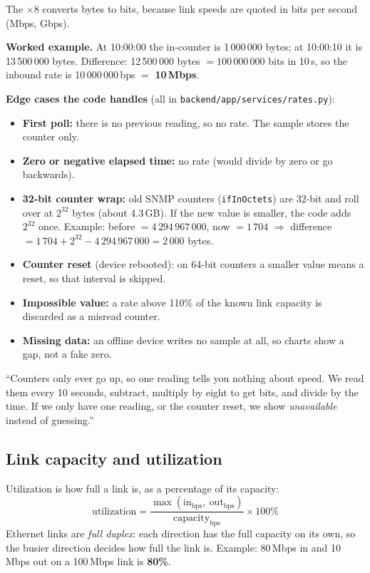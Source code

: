 \documentclass[11pt,a4paper]{article}
\newcommand{\code}[1]{\texttt{#1}}
\newcommand{\file}[1]{\texttt{\color{ink}#1}}
\begin{document}
The $\times 8$ converts bytes to bits, because link speeds are quoted in bits per second (Mbps, Gbps).

\textbf{Worked example.} At 10:00:00 the in-counter is 1\,000\,000 bytes; at 10:00:10 it is 13\,500\,000 bytes.
Difference: 12\,500\,000 bytes $= 100\,000\,000$ bits in 10\,s, so the inbound rate is 10\,000\,000\,bps $=$ \textbf{10\,Mbps}.

\textbf{Edge cases the code handles} (all in \file{backend/app/services/rates.py}):
\begin{itemize}
  \item \textbf{First poll:} there is no previous reading, so no rate. The sample stores the counter only.
  \item \textbf{Zero or negative elapsed time:} no rate (would divide by zero or go backwards).
  \item \textbf{32-bit counter wrap:} old SNMP counters (\code{ifInOctets}) are 32-bit and roll over at $2^{32}$ bytes
        (about 4.3\,GB). If the new value is smaller, the code adds $2^{32}$ once.
        Example: before $= 4\,294\,967\,000$, now $= 1\,704$ $\Rightarrow$ difference $= 1\,704 + 2^{32} - 4\,294\,967\,000 = 2\,000$ bytes.
  \item \textbf{Counter reset} (device rebooted): on 64-bit counters a smaller value means a reset, so that interval is skipped.
  \item \textbf{Impossible value:} a rate above 110\% of the known link capacity is discarded as a misread counter.
  \item \textbf{Missing data:} an offline device writes no sample at all, so charts show a gap, not a fake zero.
\end{itemize}

\begin{sayit}
``Counters only ever go up, so one reading tells you nothing about speed. We read them every 10 seconds, subtract, multiply by
eight to get bits, and divide by the time. If we only have one reading, or the counter reset, we show \emph{unavailable}
instead of guessing.''
\end{sayit}

\subsection{Link capacity and utilization}

Utilization is how full a link is, as a percentage of its capacity:
\[
\text{utilization} = \frac{\max(\text{in}_{\text{bps}},\ \text{out}_{\text{bps}})}{\text{capacity}_{\text{bps}}} \times 100\%
\]
Ethernet links are \emph{full duplex}: each direction has the full capacity on its own, so the busier direction decides how
full the link is. Example: 80\,Mbps in and 10\,Mbps out on a 100\,Mbps link is \textbf{80\%}.
\end{document}
